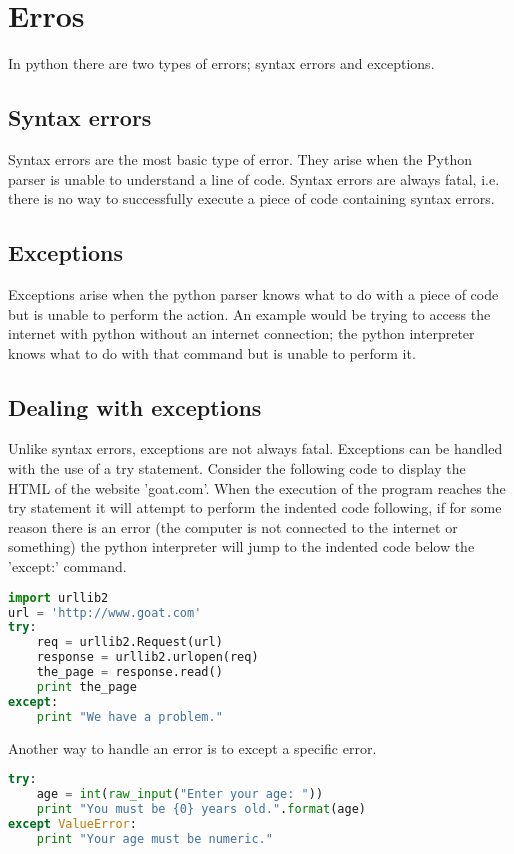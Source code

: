 \section{Erros}
In python there are two types of errors; syntax errors and exceptions.

\subsection{Syntax errors}
Syntax errors are the most basic type of error. They arise when the Python
parser is unable to understand a line of code. Syntax errors are always fatal,
i.e. there is no way to successfully execute a piece of code containing syntax
errors.

\subsection{Exceptions}
Exceptions arise when the python parser knows what to do with a piece of code
but is unable to perform the action. An example would be trying to access the
internet with python without an internet connection; the python interpreter
knows what to do with that command but is unable to perform it.

\subsection{Dealing with exceptions}
Unlike syntax errors, exceptions are not always fatal. Exceptions can be handled
with the use of a try statement.  Consider the following code to display the
HTML of the website 'goat.com'. When the execution of the program reaches the
try statement it will attempt to perform the indented code following, if for
some reason there is an error (the computer is not connected to the internet or
something) the python interpreter will jump to the indented code below the
'except:' command.
\lstset{basicstyle=\scriptsize, numbers=left, captionpos=b, tabsize=4}
\begin{lstlisting}[caption=try except 1,language={Python},
xleftmargin=15pt, label=lst:tryexcept1]
import urllib2
url = 'http://www.goat.com'
try:
    req = urllib2.Request(url)
    response = urllib2.urlopen(req)
    the_page = response.read()
    print the_page
except:
    print "We have a problem."
\end{lstlisting}

Another way to handle an error is to except a specific error.
\lstset{basicstyle=\scriptsize, numbers=left, captionpos=b, tabsize=4}
\begin{lstlisting}[caption=expect type,language={Python},
xleftmargin=15pt, label=lst:expecttype]
try:
    age = int(raw_input("Enter your age: "))
    print "You must be {0} years old.".format(age)
except ValueError:
    print "Your age must be numeric."
\end{lstlisting}

